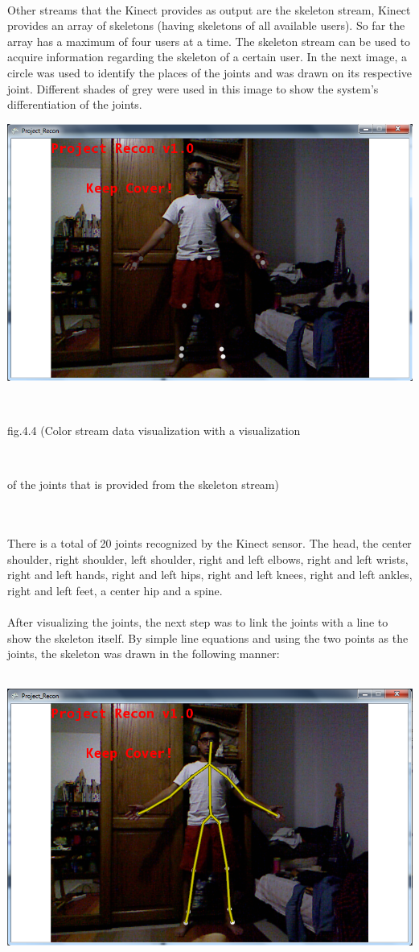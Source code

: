 \\
Other streams that the Kinect provides as output are the skeleton stream, Kinect provides an array of skeletons (having skeletons of all available users). So far the array has a maximum of four users at a time. The skeleton stream can be used to acquire information regarding the skeleton of a certain user. In the next image, a circle was used to identify the places of the joints and was drawn on its respective joint. Different shades of grey were used in this image to show the system's differentiation of the joints.
\\
\centerline{\includegraphics[scale=0.5]{color_joints.png}}
\\
\centerline{fig.4.4 (Color stream data visualization with a visualization}
\\
\centerline{of the joints that is provided from the skeleton stream)}
\\
\\
There is a total of 20 joints recognized by the Kinect sensor. The head, the center shoulder, right shoulder, left shoulder, right and left elbows, right and left wrists, right and left hands, right and left hips, right and left knees, right and left ankles, right and left feet, a center hip and a spine.
\\
\\
After visualizing the joints, the next step was to link the joints with a line to show the skeleton itself. By simple line equations and using the two points as the joints, the skeleton was drawn in the following manner:
\\
\\
\centerline{\includegraphics[scale=0.5]{color_skeleton.png}}
